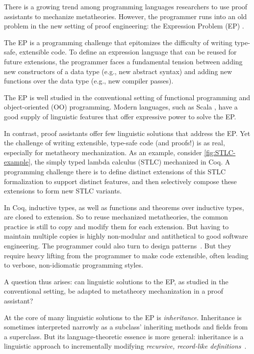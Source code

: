 
There is a growing trend among programming languages researchers
to use proof assistants to mechanize meta\-theories.
%
However, the programmer runs into an old problem
in the new setting of proof engineering:
the Expression Problem (EP) \cite{wadler-ep}.

The EP is a programming challenge that
epitomizes the difficulty of writing type-safe, extensible code.
To define an expression language that can be reused for future extensions,
the programmer faces a fundamental tension \cite{reynolds1975} between
adding new constructors of a data type (e.g., new abstract syntax) and
adding new functions over the data type (e.g., new compiler passes).

The EP is well studied in the conventional setting of functional
programming and object-oriented (OO) programming.
Modern languages, such as Scala \cite{scala-oopsla05}, have a good
supply of linguistic features that offer expressive power to solve the
EP.

In contrast, proof assistants offer few linguistic solutions that
address the EP.
Yet the challenge of writing extensible, type-safe code (and proofs!) is
as real, especially for metatheory mechanization.
As an example, consider \cref{fig:STLC-example}, the simply typed
lambda calculus (STLC) mechanized in Coq.
A programming challenge there is to define distinct extensions of this
STLC formalization to support distinct features,
and then selectively compose these extensions to form new STLC variants.

In Coq, inductive types, as well as functions and theorems over
inductive types, are closed to extension.
So to reuse mechanized metatheories,
the common practice is still to copy and modify them for each extension.
But having to maintain multiple copies is highly non-modular and
antithetical to good software engineering.
%
The programmer could also turn to design patterns~\cite{delaware2011,delaware2013}.
But they require heavy lifting from the programmer to make code
extensible, often leading to verbose, non-idiomatic programming styles.

A question thus arises: can linguistic solutions to the EP, as studied
in the conventional setting, be adapted to metatheory mechanization in
a proof assistant?

At the core of many linguistic solutions to the EP is \emph{inheritance}.
Inheritance is sometimes interpreted narrowly as a subclass'
inheriting methods and fields from a superclass.
But its language-theoretic essence is more general:
inheritance is a linguistic approach to incrementally
modifying \emph{recursive, record-like definitions}~\cite{cook1990inheritance}.

